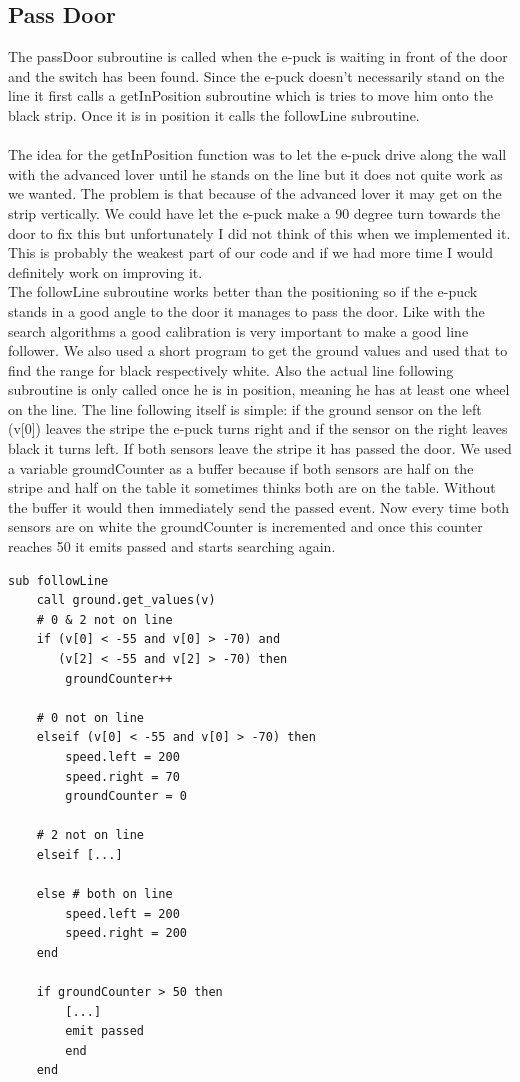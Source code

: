 \documentclass[12pt,a4paper]{article}
\begin{document}
\subsection{Pass Door}
The passDoor subroutine is called when the e-puck is waiting in front of the door and the switch has been found. Since the e-puck doesn't necessarily stand on the line it first calls a getInPosition subroutine which is tries to move him onto the black strip. Once it is in position it calls the followLine subroutine. \\\\
The idea for the getInPosition function was to let the e-puck drive along the wall with the advanced lover until he stands on the line but it does not quite work as we wanted. The problem is that because of the advanced lover it may get on the strip vertically. We could have let the e-puck make a 90 degree turn towards the door to fix this but unfortunately I did not think of this when we implemented it. This is probably the weakest part of our code and if we had more time I would definitely work on improving it. \\
The followLine subroutine works better than the positioning so if the e-puck stands in a good angle to the door it manages to pass the door. Like with the search algorithms a good calibration is very important to make a good line follower. We also used a short program to get the ground values and used that to find the range for black respectively white. Also the actual line following subroutine is only called once he is in position, meaning he has at least one wheel on the line. The line following itself is simple: if the ground sensor on the left (v[0]) leaves the stripe the e-puck turns right and if the sensor on the right leaves black it turns left. If both sensors leave the stripe it has passed the door. We used a variable groundCounter as a buffer because if both sensors are half on the stripe and half on the table it sometimes thinks both are on the table. Without the buffer it would then immediately send the passed event. Now every time both sensors are on white the groundCounter is incremented and once this counter reaches 50 it emits passed and starts searching again.
\begin{lstlisting}
sub followLine
	call ground.get_values(v)
	# 0 & 2 not on line
	if (v[0] < -55 and v[0] > -70) and 
	   (v[2] < -55 and v[2] > -70) then
		groundCounter++
	
	# 0 not on line
	elseif (v[0] < -55 and v[0] > -70) then
		speed.left = 200
		speed.right = 70
		groundCounter = 0

	# 2 not on line
	elseif [...]

	else # both on line
		speed.left = 200
		speed.right = 200
	end
		
	if groundCounter > 50 then
		[...]
		emit passed
		end
	end
\end{lstlisting}
\end{document}
